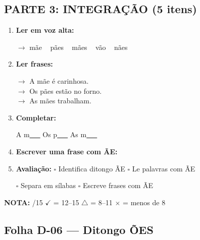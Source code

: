 \begin{exercicio}
\subsection*{PARTE 3: INTEGRAÇÃO (5 itens)}

\begin{enumerate}[resume]
  \item \textbf{Ler em voz alta:}
  \begin{center}
  $\rightarrow$ mãe  ~  pães  ~  mães  ~  vão  ~  nães
  \end{center}

  \item \textbf{Ler frases:}
  \begin{center}
  $\rightarrow$ A mãe é carinhosa.\\
  $\rightarrow$ Os pães estão no forno.\\
  $\rightarrow$ As mães trabalham.
  \end{center}

  \item \textbf{Completar:}
  \begin{center}
  A m\underline{~~~} \quad Os p\underline{~~~} \quad As m\underline{~~~}
  \end{center}

  \item \textbf{Escrever uma frase com ÃE:}
  \begin{center}
  \underline{\hspace{12cm}}
  \end{center}

  \item \textbf{Avaliação:} $\square$ Identifica ditongo ÃE \quad $\square$ Le palavras com ÃE
  \begin{center}
  $\square$ Separa em sílabas \quad $\square$ Escreve frases com ÃE
  \end{center}
\end{enumerate}

\noindent\textbf{NOTA:} \underline{\hspace{1cm}}/15 \quad $\checkmark$ = 12--15 \quad $\triangle$ = 8--11 \quad $\times$ = menos de 8
\end{exercicio}


\subsection{Folha D-06 --- Ditongo ÕES}

